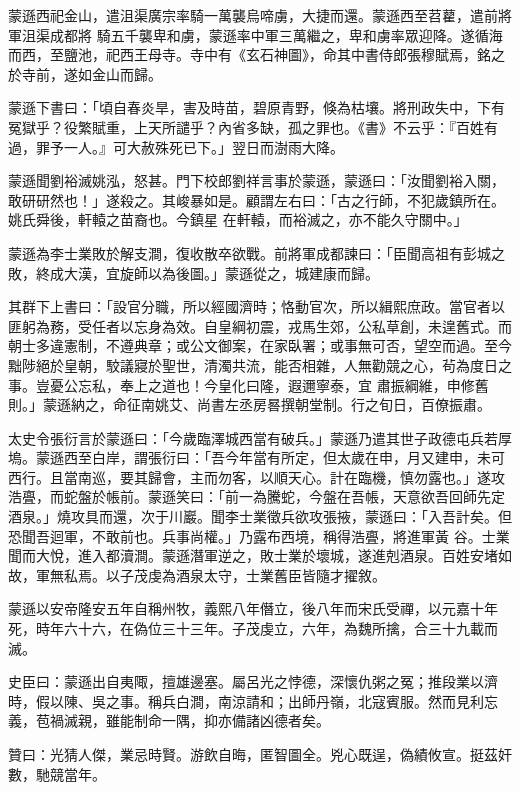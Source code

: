 \begin{pinyinscope}
 蒙遜西祀金山，遣沮渠廣宗率騎一萬襲烏啼虜，大捷而還。蒙遜西至苕藋，遣前將軍沮渠成都將
 騎五千襲卑和虜，蒙遜率中軍三萬繼之，卑和虜率眾迎降。遂循海而西，至鹽池，祀西王母寺。寺中有《玄石神圖》，命其中書侍郎張穆賦焉，銘之於寺前，遂如金山而歸。



 蒙遜下書曰：「頃自春炎旱，害及時苗，碧原青野，倏為枯壤。將刑政失中，下有冤獄乎？役繁賦重，上天所譴乎？內省多缺，孤之罪也。《書》不云乎：『百姓有過，罪予一人。』可大赦殊死已下。」翌日而澍雨大降。



 蒙遜聞劉裕滅姚泓，怒甚。門下校郎劉祥言事於蒙遜，蒙遜曰：「汝聞劉裕入關，敢研研然也！」遂殺之。其峻暴如是。顧謂左右曰：「古之行師，不犯歲鎮所在。姚氏舜後，軒轅之苗裔也。今鎮星
 在軒轅，而裕滅之，亦不能久守關中。」



 蒙遜為李士業敗於解支澗，復收散卒欲戰。前將軍成都諫曰：「臣聞高祖有彭城之敗，終成大漢，宜旋師以為後圖。」蒙遜從之，城建康而歸。



 其群下上書曰：「設官分職，所以經國濟時；恪動官次，所以緝熙庶政。當官者以匪躬為務，受任者以忘身為效。自皇綱初震，戎馬生郊，公私草創，未遑舊式。而朝士多違憲制，不遵典章；或公文御案，在家臥署；或事無可否，望空而過。至今黜陟絕於皇朝，駮議寢於聖世，清濁共流，能否相雜，人無勸競之心，茍為度日之事。豈憂公忘私，奉上之道也！今皇化曰隆，遐邇寧泰，宜
 肅振綱維，申修舊則。」蒙遜納之，命征南姚艾、尚書左丞房晷撰朝堂制。行之旬日，百僚振肅。



 太史令張衍言於蒙遜曰：「今歲臨澤城西當有破兵。」蒙遜乃遣其世子政德屯兵若厚塢。蒙遜西至白岸，謂張衍曰：「吾今年當有所定，但太歲在申，月又建申，未可西行。且當南巡，要其歸會，主而勿客，以順天心。計在臨機，慎勿露也。」遂攻浩亹，而蛇盤於帳前。蒙遜笑曰：「前一為騰蛇，今盤在吾帳，天意欲吾回師先定酒泉。」燒攻具而還，次于川巖。聞李士業徵兵欲攻張掖，蒙遜曰：「入吾計矣。但恐聞吾迴軍，不敢前也。兵事尚權。」乃露布西境，稱得浩亹，將進軍黃
 谷。士業聞而大悅，進入都瀆澗。蒙遜潛軍逆之，敗士業於壞城，遂進剋酒泉。百姓安堵如故，軍無私焉。以子茂虔為酒泉太守，士業舊臣皆隨才擢敘。



 蒙遜以安帝隆安五年自稱州牧，義熙八年僭立，後八年而宋氏受禪，以元嘉十年死，時年六十六，在偽位三十三年。子茂虔立，六年，為魏所擒，合三十九載而滅。



 史臣曰：蒙遜出自夷陬，擅雄邊塞。屬呂光之悖德，深懷仇粥之冤；推段業以濟時，假以陳、吳之事。稱兵白澗，南涼請和；出師丹嶺，北寇賓服。然而見利忘義，苞禍滅親，雖能制命一隅，抑亦備諸凶德者矣。



 贊曰：光猜人傑，業忌時賢。游飲自晦，匿智圖全。兇心既逞，偽績攸宣。挺茲奸數，馳競當年。



\end{pinyinscope}